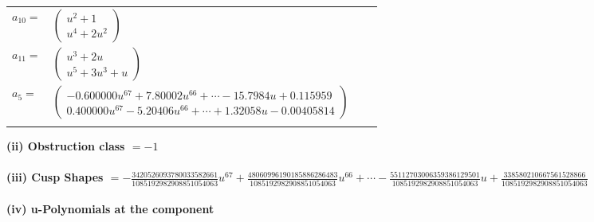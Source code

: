 \documentclass[1p]{elsarticle_modified}
\theoremstyle{definition}
\begin{document}
\begin{tabular}{m{7pt} m{180pt} m{7pt} m{180pt} }
\flushright $a_{10}=$&$\begin{pmatrix}u^2+1\\u^4+2 u^2\end{pmatrix}$ \\
\flushright $a_{11}=$&$\begin{pmatrix}u^3+2 u\\u^5+3 u^3+u\end{pmatrix}$ \\
\flushright $a_{5}=$&$\begin{pmatrix}-0.600000 u^{67}+7.80002 u^{66}+\cdots-15.7984 u+0.115959\\0.400000 u^{67}-5.20406 u^{66}+\cdots+1.32058 u-0.00405814\end{pmatrix}$\\&\end{tabular}
\flushleft \textbf{(ii) Obstruction class $= -1$}\\~\\
\flushleft \textbf{(iii) Cusp Shapes $= -\frac{3420526093780033582661}{1085192982908851054063} u^{67}+\frac{48060996190185886286483}{1085192982908851054063} u^{66}+\cdots-\frac{55112703006359386129501}{1085192982908851054063} u+\frac{338580210667561528866}{1085192982908851054063}$}\\~\\
\newpage\renewcommand{\arraystretch}{1}
\flushleft \textbf{(iv) u-Polynomials at the component}\newline \\
\end{document}
